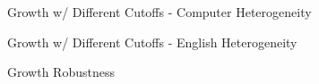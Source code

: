 \documentclass[aspectratio=169]{beamer}
\newcommand{\showtable}[1]
    { 
      \resizebox{0.75\textwidth}{!}{
          \begin{threeparttable}
              
          \end{threeparttable}
        }
    }
\newcommand{\showfiguretwocol}[2]{%
  \begin{columns}[T] %
    \begin{column}{.5\textwidth}
      \resizebox{1\textwidth}{!}{%
        \texttt{[image: /Users/st2246/Work/Temperature/output/figures/\#1]} 
      }
    \end{column}
    \begin{column}{.5\textwidth}
      \resizebox{1\textwidth}{!}{%
        \texttt{[image: /Users/st2246/Work/Temperature/output/figures/\#2]} 
      }
    \end{column}
  \end{columns}%
}
\begin{document}
\begin{frame}{Growth w/ Different Cutoffs - Computer Heterogeneity}
\begin{center}
    \showtable{table_growth_cutoff_changes_hetero_comp.tex}
\end{center}
\end{frame}

\begin{frame}{Growth w/ Different Cutoffs - English Heterogeneity}
\begin{center}
    \showtable{table_growth_cutoff_changes_hetero_eng.tex}
\end{center}
\end{frame}


%
%
%
\begin{frame}{Growth Robustness}
\begin{center}
    \showtable{table_growth_robustness.tex}
\end{center}
\end{frame}
%
%
%



\end{document}
